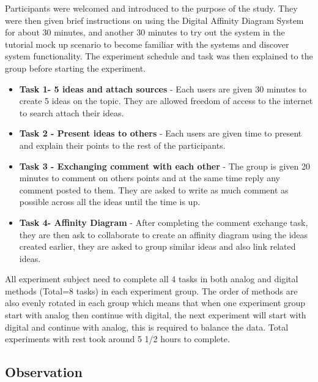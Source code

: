 \documentclass{sigchi}
\begin{document}
\begin{itemize}
\begin{itemize}
Participants were welcomed and introduced to the purpose of the study. They were then given brief instructions on using the Digital Affinity Diagram System for about 30 minutes, and another 30 minutes to try out the system in the tutorial mock up scenario to become familiar with the systems and discover system functionality. The experiment schedule and task was then explained to the group before starting the experiment. 

\begin{itemize}
\item \textbf{Task 1- 5 ideas and attach sources} - Each users are given 30 minutes to create 5 ideas on the topic. They are allowed freedom of access to the internet to search attach their ideas. 
\item \textbf{Task 2 - Present  ideas to others } - Each users are given time to present and explain their points to the rest of the participants. 
\item \textbf{Task 3 - Exchanging comment with each other} - The group is given 20 minutes to comment on others points and at the same time reply any comment posted to them. They are asked to write as much comment as possible across all the ideas until the time is up. 

\item \textbf{Task 4- Affinity Diagram} - After completing the comment exchange task, they are then ask to collaborate to create an affinity diagram using the ideas created earlier, they are asked to group similar ideas and also link related ideas. 
\end{itemize}
All experiment subject need to complete all 4 tasks in both analog and digital methods (Total=8 tasks) in each experiment group. The order of methods are also evenly rotated in each group which means that when one experiment group start with analog then continue with digital, the next experiment will start with digital and continue with analog, this is required to balance the data. Total experiments with rest took around 5 1/2 hours to complete. 

\subsection{Observation}



\end{itemize}
\end{itemize}
\end{document}
